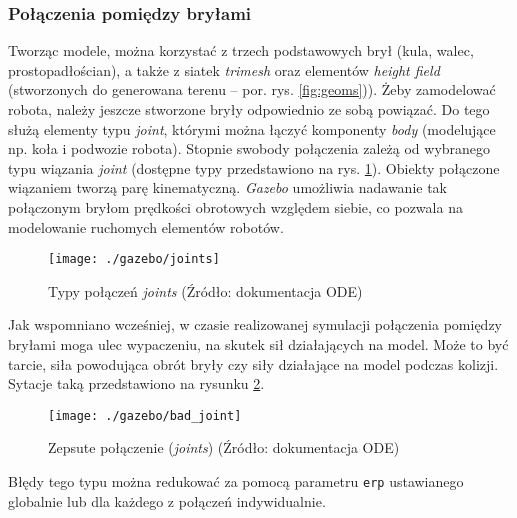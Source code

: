 	
	\subsubsection{Połączenia pomiędzy bryłami }
	Tworząc modele, można korzystać z trzech podstawowych brył (kula, walec, prostopadłościan), a także z siatek \textit{trimesh} oraz elementów \textit{height field} (stworzonych do generowana terenu -- por. rys. \ref{fig:geoms})).
	Żeby zamodelować robota, należy jeszcze stworzone bryły odpowiednio ze sobą powiązać. Do tego służą elementy typu \textit{joint}, którymi można łączyć komponenty \textit{body} (modelujące np. koła i podwozie robota).
	Stopnie swobody połączenia zależą od wybranego typu wiązania \textit{joint} (dostępne typy przedstawiono na rys. \ref{fig:joints}). Obiekty połączone wiązaniem tworzą parę kinematyczną.
	\textit{Gazebo} umożliwia nadawanie tak połączonym bryłom prędkości obrotowych względem siebie, co pozwala na modelowanie ruchomych elementów robotów.
	\begin{figure}[H]
	\centering
	\texttt{[image: ./gazebo/joints]}
	\caption{Typy połączeń \textit{joints} (Źródło: dokumentacja ODE) \label{fig:joints}}
	\end{figure}
	Jak wspomniano wcześniej, w czasie realizowanej symulacji połączenia pomiędzy bryłami moga ulec wypaczeniu, na skutek sił działających na model. Może to być tarcie,
	siła powodująca obrót bryły czy siły działające na model podczas kolizji. Sytacje taką przedstawiono na rysunku \ref{fig:bad_joint}.
	\begin{figure}[H]
	\centering
	\texttt{[image: ./gazebo/bad\_joint]}
	\caption{Zepsute połączenie (\textit{joints}) (Źródło: dokumentacja ODE) \label{fig:bad_joint}}
	\end{figure}
	Błędy tego typu można redukować za pomocą parametru \texttt{erp} ustawianego globalnie lub dla każdego z połączeń indywidualnie.
